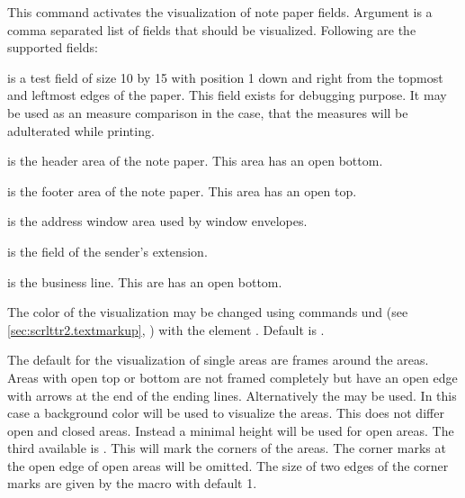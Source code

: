 \begin{Declaration}
\end{Declaration}
This command activates the visualization of note paper fields. Argument
 is a comma separated list of fields that should be
visualized. Following are the supported fields:
\begin{labeling}[~--]{}
\item[\PValue{test}] is a test field of size 10 by 15 with
  position 1 down and right from the topmost and leftmost edges of
  the paper. This field exists for debugging purpose. It may be used as an
  measure comparison in the case, that the measures will be adulterated while
  printing.
\item[\PValue{head}] is the header area of the note paper. This area has an
  open bottom.
\item[\PValue{foot}] is the footer area of the note paper. This area has an
  open top.
\item[\PValue{address}] is the address window area used by window envelopes.
\item[\PValue{location}] is the field of the sender's extension.
\item[\PValue{refline}] is the business line. This are has an open bottom.
\end{labeling}%
%
The color of the visualization may be changed using
commands und  (see
\autoref{sec:scrlttr2.textmarkup},
) with the element
. Default is
.%
%
%
\EndIndexGroup


\begin{Declaration}
\end{Declaration}
The default for the visualization of single areas are
frames around the areas. Areas with open top or
bottom are not framed completely but have an open edge with arrows at the end
of the ending lines. Alternatively the
  may be used. In this case a
background color will be used to visualize the areas. This does not differ open
and closed areas. Instead a minimal height will be used for open areas. The
third available  is
. This will mark the corners of the areas. The corner marks at
the open edge of open areas will be omitted. The size of two edges of the
corner marks are given by the macro  with default 1.%
\EndIndexGroup


